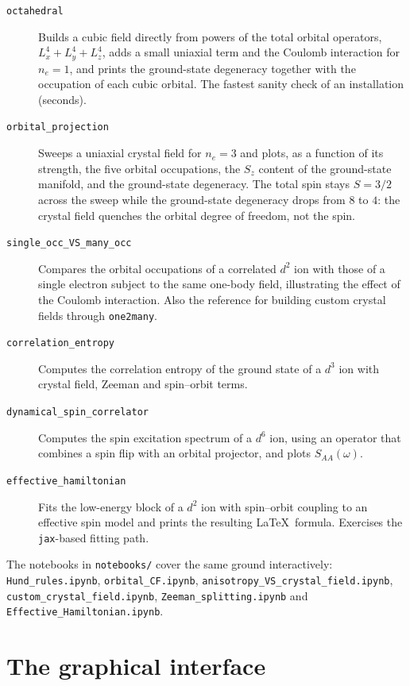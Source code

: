 \documentclass[11pt,a4paper]{article}
\newcommand{\op}[1]{\texttt{#1}}
\begin{document}
\begin{description}
\item[\op{octahedral}] Builds a cubic field directly from powers of the total
      orbital operators, $L_x^4+L_y^4+L_z^4$, adds a small uniaxial term and the
      Coulomb interaction for $n_e=1$, and prints the ground-state degeneracy
      together with the occupation of each cubic orbital.  The fastest sanity
      check of an installation (seconds).
\item[\op{orbital\_projection}] Sweeps a uniaxial crystal field for $n_e=3$ and
      plots, as a function of its strength, the five orbital occupations, the
      $S_z$ content of the ground-state manifold, and the ground-state
      degeneracy.  The total spin stays $S=3/2$ across the sweep while the
      ground-state degeneracy drops from $8$ to $4$: the crystal field quenches
      the orbital degree of freedom, not the spin.
\item[\op{single\_occ\_VS\_many\_occ}] Compares the orbital occupations of a
      correlated $d^2$ ion with those of a single electron subject to the same
      one-body field, illustrating the effect of the Coulomb interaction.  Also
      the reference for building custom crystal fields through
      \op{one2many}.
\item[\op{correlation\_entropy}] Computes the correlation entropy of the ground
      state of a $d^3$ ion with crystal field, Zeeman and spin--orbit terms.
\item[\op{dynamical\_spin\_correlator}] Computes the spin excitation spectrum of
      a $d^6$ ion, using an operator that combines a spin flip with an orbital
      projector, and plots $S_{AA}(\omega)$.
\item[\op{effective\_hamiltonian}] Fits the low-energy block of a $d^2$ ion with
      spin--orbit coupling to an effective spin model and prints the resulting
      \LaTeX\ formula.  Exercises the \op{jax}-based fitting path.
\end{description}

\noindent
The notebooks in \op{notebooks/} cover the same ground interactively:
\op{Hund\_rules.ipynb}, \op{orbital\_CF.ipynb},
\op{anisotropy\_VS\_crystal\_field.ipynb}, \op{custom\_crystal\_field.ipynb},
\op{Zeeman\_splitting.ipynb} and \op{Effective\_Hamiltonian.ipynb}.

\section{The graphical interface}
\end{document}

